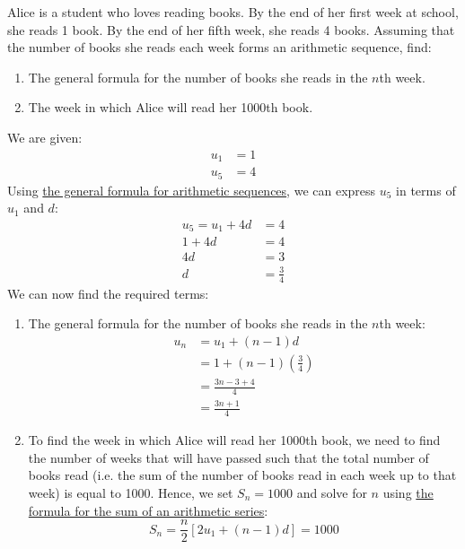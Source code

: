 \newpage
\begin{exercise}[Medium]
	Alice is a student who loves reading books. By the end of her first week at school, she reads 1 book. By the end of her 
	fifth week, she reads 4 books. Assuming that the number of books she reads each week forms an arithmetic sequence, find:
	\begin{enumerate}[label=(\alph*)]
		\item The general formula for the number of books she reads in the $n$th week.
		\item The week in which Alice will read her 1000th book.
	\end{enumerate}
\end{exercise}
\begin{answer}
	We are given:
	\begin{align*}
		u_1 &= 1 \\
		u_5 &= 4
	\end{align*}
	Using \hyperref[prop:arithmetic-general-formula]{the general formula for arithmetic sequences}, we can express $u_5$ in terms of $u_1$ and $d$:
	\begin{align*}
		u_5 = u_1 + 4d &= 4 \\
		1 + 4d &= 4 \\
		4d &= 3 \\
		d &= \frac{3}{4}
	\end{align*}
	We can now find the required terms:
	\begin{enumerate}[label=(\alph*)]
		\item The general formula for the number of books she reads in the $n$th week:
		\begin{align*}
			u_n &= u_1 + (n-1)d \\
			&= 1 + (n-1)\left(\frac{3}{4}\right) \\
			&= \frac{3n - 3 + 4}{4} \\
			&= \frac{3n + 1}{4}
		\end{align*}
		\item To find the week in which Alice will read her 1000th book, we need to find the number of weeks that will
		have passed such that the total number of books read (i.e. the sum of the number of books read in each week up to that week)
		is equal to 1000. Hence, we set $S_n = 1000$ and solve for $n$ using \hyperref[prop:arithmetic-series-sum]{the formula for the sum of an arithmetic series}:
		\begin{equation*}
			S_n = \frac{n}{2}[2u_1 + (n-1)d] = 1000
		\end{equation*}

\end{enumerate}
\end{answer}
